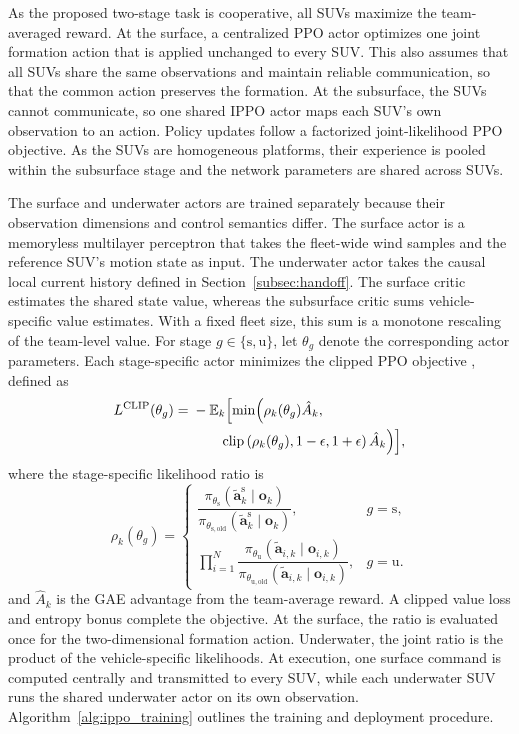 \documentclass[a4paper,fleqn]{cas-dc}
\begin{document}
As the proposed two-stage task is cooperative, all SUVs maximize the
team-averaged reward. At the surface, a centralized PPO actor optimizes one
joint formation action that is applied unchanged to every SUV. This also
assumes that all SUVs share the same observations and maintain reliable
communication, so that the common action preserves the formation. At the
subsurface, the SUVs cannot communicate, so one shared IPPO actor maps each
SUV's own observation to an action. Policy updates follow a factorized
joint-likelihood PPO objective. As the SUVs are homogeneous platforms, their
experience is pooled within the subsurface stage and the network parameters are
shared across SUVs.

The surface and underwater actors are trained separately because their
observation dimensions and control semantics differ. The surface actor is a
memoryless multilayer perceptron that takes the fleet-wide wind samples and
the reference SUV's motion state as input. The underwater actor takes the causal
local current history defined in Section~\ref{subsec:handoff}.
The surface critic estimates the shared state value, whereas the subsurface
critic sums vehicle-specific value estimates. With a fixed fleet size, this
sum is a monotone rescaling of the team-level value. For stage
\(g\in\{\mathrm{s},\mathrm{u}\}\), let \(\theta_g\) denote the corresponding
actor parameters. Each stage-specific actor minimizes the clipped PPO objective
\citep{r40}, defined as
\begin{equation}
\begin{aligned}
L^{\mathrm{CLIP}}(\theta_g)
={}&-\mathbb{E}_k\Bigl[
\min\Bigl(
\rho_k(\theta_g)\hat A_k,\\
&\qquad
\operatorname{clip}
\left(\rho_k(\theta_g),1-\epsilon,1+\epsilon\right)
\hat A_k
\Bigr)\Bigr],
\end{aligned}
\label{eq:ppo}
\end{equation}
where the stage-specific likelihood ratio is
\begin{equation}
\rho_k(\theta_g)=
\begin{cases}
\dfrac{
\pi_{\theta_{\mathrm{s}}}
\left(\tilde{\mathbf{a}}_{k}^{\mathrm{s}}\mid\mathbf{o}_{k}\right)}
{\pi_{\theta_{\mathrm{s,old}}}
\left(\tilde{\mathbf{a}}_{k}^{\mathrm{s}}\mid\mathbf{o}_{k}\right)},
& g=\mathrm{s},\\[3mm]
\displaystyle\prod_{i=1}^{N}
\dfrac{
\pi_{\theta_{\mathrm{u}}}
\left(\tilde{\mathbf{a}}_{i,k}\mid\mathbf{o}_{i,k}\right)}
{\pi_{\theta_{\mathrm{u,old}}}
\left(\tilde{\mathbf{a}}_{i,k}\mid\mathbf{o}_{i,k}\right)},
& g=\mathrm{u}.
\end{cases}
\label{eq:ratio}
\end{equation}
and $\hat A_k$ is the GAE advantage from the team-average reward. A clipped
value loss and entropy bonus complete the objective. At the surface, the ratio
is evaluated once for the two-dimensional formation action. Underwater, the
joint ratio is the product of the vehicle-specific likelihoods. At execution,
one surface command is computed centrally and transmitted to every SUV, while
each underwater SUV runs the shared underwater actor on its own observation.
Algorithm~\ref{alg:ippo_training} outlines the training and deployment
procedure.
\end{document}
